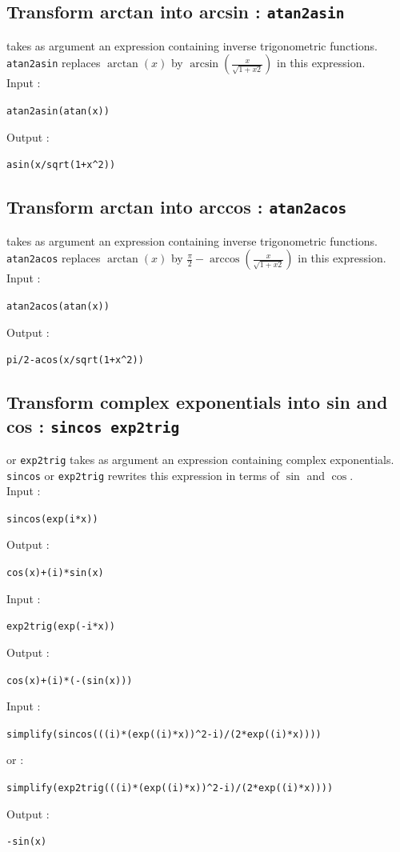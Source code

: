 \documentclass[a4paper,11pt]{book}
\begin{document}
\subsection{Transform arctan into arcsin : {\tt atan2asin}}
 takes as argument an expression
containing inverse trigonometric functions.
{\tt atan2asin} replaces $\arctan(x)$ by 
$\displaystyle \arcsin(\frac{x}{\sqrt{1+x2}})$ in this expression.\\
Input :
\begin{center}{\tt atan2asin(atan(x))}\end{center}
Output :
\begin{center}{\tt asin(x/sqrt(1+x\verb|^|2))}\end{center}

\subsection{Transform arctan into arccos : {\tt atan2acos}}
 takes as argument an expression containing 
inverse trigonometric functions.\\
{\tt atan2acos} replaces $\arctan(x)$ by 
$\displaystyle \frac{\pi}{2}-\arccos(\frac{x}{\sqrt{1+x2}})$ 
in this expression.\\
Input :
\begin{center}{\tt atan2acos(atan(x))}\end{center}
Output :
\begin{center}{\tt pi/2-acos(x/sqrt(1+x\verb|^|2))}\end{center}

\subsection{Transform complex exponentials into sin and cos : {\tt sincos exp2trig}}
  or {\tt exp2trig} takes as argument an expression 
containing complex exponentials.\\
{\tt sincos} or {\tt exp2trig} rewrites this expression in terms of  
$\sin$ and  $\cos$.\\
Input :
\begin{center}{\tt sincos(exp(i*x))}\end{center}
Output :
\begin{center}{\tt cos(x)+(i)*sin(x)}\end{center}
Input :
\begin{center}{\tt exp2trig(exp(-i*x))}\end{center}
Output :
\begin{center}{\tt cos(x)+(i)*(-(sin(x)))}\end{center}
Input :
\begin{center}{\tt simplify(sincos(((i)*(exp((i)*x))\verb|^|2-i)/(2*exp((i)*x))))}\end{center}
or :
\begin{center}{\tt simplify(exp2trig(((i)*(exp((i)*x))\verb|^|2-i)/(2*exp((i)*x))))}\end{center}
Output :
\begin{center}{\tt -sin(x)}\end{center}
\end{document}
